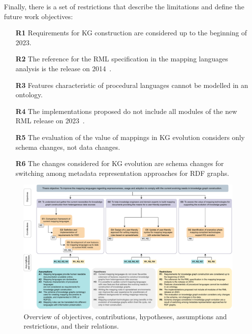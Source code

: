 Finally, there is a set of restrictions that describe the limitations and define the future work objectives:

\begin{enumerate}
    \item[\textbf{R1}] Requirements for KG construction are considered up to the beginning of 2023.
    \item[\textbf{R2}] The reference for the RML specification in the mapping languages analysis is the release on 2014~\parencite{Dimou2014rml}.
    \item[\textbf{R3}] Features characteristic of procedural languages cannot be modelled in an ontology.
    \item[\textbf{R4}] The implementations proposed do not include all modules of the new RML release on 2023~\parencite{iglesias2023rml}. 
    \item[\textbf{R5}] The evaluation of the value of mappings in KG evolution considers only schema changes, not data changes.
    \item[\textbf{R6}] The changes considered for KG evolution are schema changes for switching among metadata representation approaches for RDF graphs.
\end{enumerate}


\begin{figure}
    \centering
    \includegraphics[width=1\linewidth]{figures/chp3_summary.pdf}
    \caption[Relations between objectives, contributions, hypotheses, assumptions and restrictions of this thesis]{Overview of objectives, contributions, hypotheses, assumptions and restrictions, and their relations.}
    \label{fig:chp3_summary}
\end{figure}


